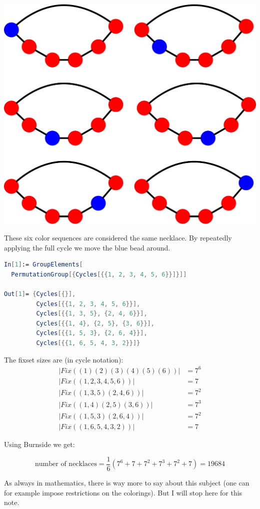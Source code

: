 \begin{marginfigure}[0.5in]
\includegraphics[scale=0.3]{necklaces.pdf}
\caption{These six color sequences are considered the same necklace. By repeatedly applying the full cycle we move the blue bead around.}
\label{fig:necklaces}
\end{marginfigure}

\begin{lstlisting}[language=Mathematica]
In[1]:= GroupElements[
  PermutationGroup[{Cycles[{{1, 2, 3, 4, 5, 6}}]}]]

Out[1]= {Cycles[{}], 
         Cycles[{{1, 2, 3, 4, 5, 6}}], 
         Cycles[{{1, 3, 5}, {2, 4, 6}}],
         Cycles[{{1, 4}, {2, 5}, {3, 6}}], 
         Cycles[{{1, 5, 3}, {2, 6, 4}}],
         Cycles[{{1, 6, 5, 4, 3, 2}}]}
\end{lstlisting}

The fixset sizes are (in cycle notation):
\begin{align*}
|Fix((1)(2)(3)(4)(5)(6))| &= 7^6 \\
|Fix((1,2,3,4,5,6))| &= 7 \\
|Fix((1,3,5)(2,4,6))| &= 7^2 \\
|Fix((1,4)(2,5)(3,6))| &= 7^3 \\
|Fix((1, 5, 3)(2,6,4))| &= 7^2 \\
|Fix((1,6,5,4,3,2))| &= 7
\end{align*}

Using Burnside we get:

$$
\text{number of necklaces} = \frac{1}{6} (7^6 + 7 + 7^2 + 7^3 + 7^2 + 7) = 19684
$$

As always in mathematics, there is way more to say about this subject (one can for example impose restrictions on the colorings). But I will stop here for this note.
